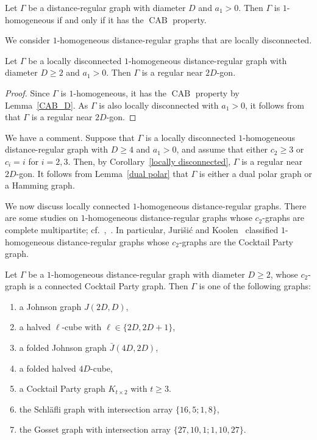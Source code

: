 \begin{lemma}[{cf.~\cite[Theorem~3.1]{JK2000-1}}]\label{CAB_D}
Let $\Gamma$ be a distance-regular graph with diameter $D$ and $a_1 > 0$. 
Then $\Gamma$ is $1$-homogeneous if and only if it has the $\operatorname{CAB}$ property.
\end{lemma}

We consider $1$-homogeneous distance-regular graphs that are locally disconnected.
\begin{coro}[{cf.~\cite[Corollary~3.3]{JK2000-1}}]\label{locally disconnected}
Let $\Gamma$ be a locally disconnected $1$-homogeneous distance-regular graph with diameter $D \geqslant 2$ and $a_1 > 0$.
Then $\Gamma$ is a regular near $2D$-gon.
\end{coro}
\begin{proof}
Since $\Gamma$ is $1$-homogeneous, it has the $\operatorname{CAB}$ property by Lemma~\ref{CAB_D}.
As $\Gamma$ is also locally disconnected with $a_1 > 0$, it follows from~\cite[Theorem 2.3]{JK2000-1} that $\Gamma$ is a regular near $2D$-gon.
\end{proof}

We have a comment.
Suppose that $\Gamma$ is a locally disconnected $1$-homogeneous distance-regular graph with $D \geqslant 4$ and $a_1 > 0$, and assume that either $c_2 \geqslant 3$ or $c_i = i$ for $i = 2,3$.
Then, by Corollary~\ref{locally disconnected}, $\Gamma$ is a regular near $2D$-gon. 
It follows from Lemma~\ref{dual polar} that $\Gamma$ is either a dual polar graph or a Hamming graph.

We now discuss locally connected $1$-homogeneous distance-regular graphs. 
There are some studies on $1$-homogeneous distance-regular graphs whose $c_2$-graphs are complete multipartite; cf.~\cite{JK2003},~\cite{JMT2010}. 
In particular, Juri\v si\' c and Koolen~\cite{JK2003} classified $1$-homogeneous distance-regular graphs whose $c_2$-graphs are the Cocktail Party graph.

\begin{theorem}[{\cite[Theorem 1.1]{JK2003}}]\label{1-homogenious JK}
Let $\Gamma$ be a $1$-homogeneous distance-regular graph with diameter $D \geqslant 2$, whose $c_2$-graph is a connected Cocktail Party graph. 
Then $\Gamma$ is one of the following graphs:
\begin{enumerate}[\normalfont(i)]
  \item a Johnson graph $J(2D,D)$,
  \item a halved $\ell$-cube with $\ell \in \{2D,2D+1\}$,
  \item a folded Johnson graph $\bar{J}(4D,2D)$,
  \item a folded halved $4D$-cube,
  \item a Cocktail Party graph $K_{t \times 2}$ with $t \geqslant 3$.
  \item the Schl\"{a}fli graph with intersection array $\{16,5;1,8\}$,
  \item the Gosset graph with intersection array $\{27,10,1; 1,10,27\}$.
\end{enumerate}
\end{theorem}

